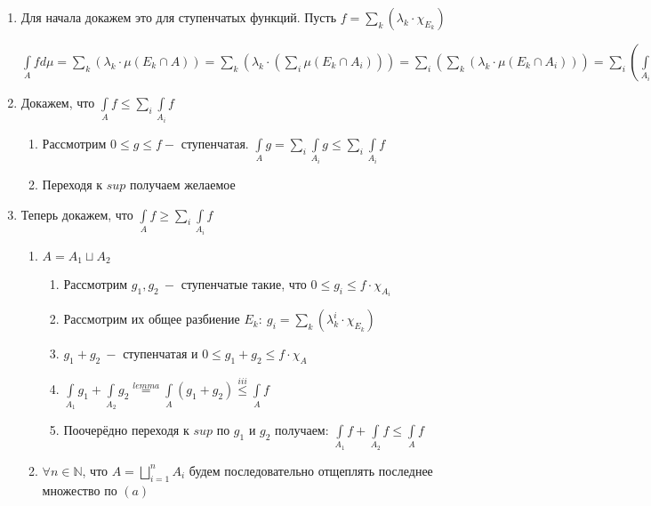 \documentclass[paper=a4, fontsize=13.2pt]{article}
\begin{document}
\begin{enumerate}
	\item Для начала докажем это для ступенчатых функций. Пусть $f = \sum\limits_{k} (\lambda_k \cdot \chi_{E_k})$

 $\int\limits_{A}fd\mu = \sum\limits_{k} (\lambda_k \cdot \mu(E_k \cap A)) =
 \sum\limits_{k} (\lambda_k \cdot (\sum\limits_{i} \mu(E_k \cap A_i))) =
 \sum\limits_{i}(\sum\limits_{k}(\lambda_k \cdot \mu(E_k \cap A_i))) = \sum\limits_{i}(\int\limits_{A_i}f)$

	\item Докажем, что $\int\limits_{A}f \leqslant \sum\limits_{i} \int\limits_{A_{i}}f$

	\begin{enumerate}
		\item Рассмотрим $0 \leqslant g \leqslant f - $ ступенчатая. $\int\limits_{A}g = \sum\limits_{i} \int\limits_{A_i}g \leqslant \sum\limits_{i} \int\limits_{A_{i}}f$

		 \item Переходя к $sup$ получаем желаемое
	\end{enumerate}

	\item Теперь докажем, что $\int\limits_{A}f \geqslant \sum\limits_{i} \int\limits_{A_{i}}f$
	\begin{enumerate}
		\item $A = A_1\sqcup A_2$

		\begin{enumerate}
			\item Рассмотрим $g_1, g_2\ -$ ступенчатые такие, что $0 \leqslant g_i \leqslant f \cdot \chi_{A_i}$

			\item Рассмотрим их общее разбиение $E_k:\ g_i = \sum\limits_k (\lambda_k^i \cdot \chi_{E_k})$

			\item $g_1 + g_2\ - $ ступенчатая и $0 \leqslant g_1 + g_2 \leqslant f \cdot \chi_{A}$

			\item $\int\limits_{A_1}g_1 + \int\limits_{A_2}g_2 \stackrel{lemma}{=} \int\limits_{A}(g_1 + g_2) \stackrel{iii}{\leqslant} \int\limits_{A}f$

			\item Поочерёдно переходя к $sup$ по $g_1$ и $g_2$ получаем: $\int\limits_{A_1}f + \int\limits_{A_2}f \leqslant \int\limits_{A}f$
		\end{enumerate}

	\item $\forall n \in \mathbb{N}$, что $A = \bigsqcup\limits_{i=1}^{n}A_{i}$ будем последовательно отщеплять последнее множество по $(a)$


\end{enumerate}
\end{enumerate}
\end{document}
